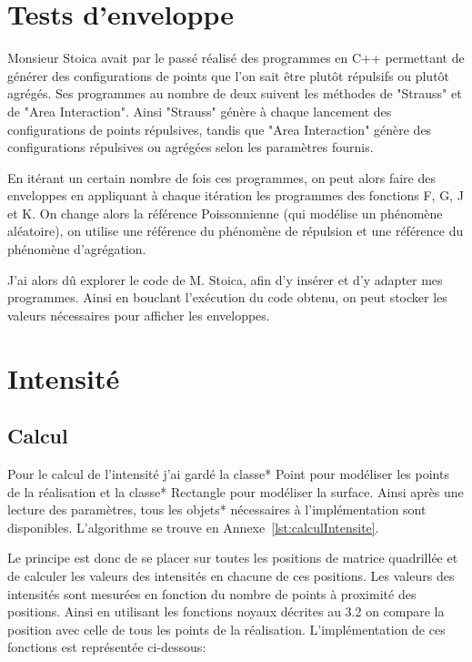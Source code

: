 \documentclass[stage2a]{tnreport}
\begin{document}
\section{Tests d'enveloppe}

Monsieur Stoica avait par le passé réalisé des programmes en C++ permettant de générer des configurations de points que l'on sait être plutôt répulsifs ou plutôt agrégés. Ses programmes au nombre de deux suivent les méthodes de "Strauss" et de "Area Interaction". Ainsi "Strauss" génère à chaque lancement des configurations de points répulsives, tandis que "Area Interaction" génère
des configurations répulsives ou agrégées selon les paramètres fournis.

En itérant un certain nombre de fois ces programmes, on peut alors faire des enveloppes en appliquant à chaque itération les programmes des fonctions F, G, J et K. On change alors la référence Poissonnienne (qui modélise un phénomène aléatoire), on utilise une référence du phénomène de répulsion et une référence du phénomène d'agrégation.

J'ai alors dû explorer le code de M. Stoica, afin d'y insérer et d'y adapter mes programmes. Ainsi en bouclant l'exécution du code obtenu, on peut stocker les valeurs nécessaires pour afficher les enveloppes.

\section{Intensité}


\subsection{Calcul}

Pour le calcul de l'intensité j'ai gardé la \gls{classe}* Point pour modéliser les points de la réalisation et la \gls{classe}* Rectangle pour modéliser la surface.
Ainsi après une lecture des paramètres, tous les \gls{objet}s* nécessaires à l'implémentation sont disponibles. L'algorithme se trouve en Annexe~\ref{lst:calculIntensite}.
    
Le principe est donc de se placer sur toutes les positions de matrice quadrillée et de calculer les valeurs des intensités en chacune de ces positions. Les valeurs des intensités sont mesurées en fonction du nombre de points à proximité des positions. Ainsi en utilisant les fonctions noyaux décrites au 3.2 on compare la position avec celle de tous les points de la réalisation. L'implémentation de ces fonctions est représentée ci-dessous:
\end{document}
